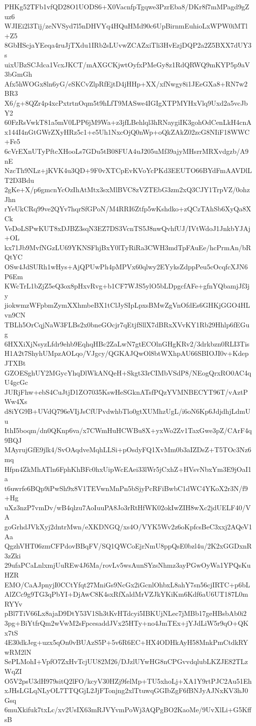 PHKg52TFb1vfQD28O1UODS6+X0VacnfpTgqwe3PzrEba8/DKr8f7mMPagd9gZuz6
WJIEi2l3Tij/zeNVSyd7l5nDHVYq4HQuHMd90c6UpBirnmEuhioLxWPW0iMTl+Z5
8GbHScjaYEeqa4ruJjTXdu1IRb2sLUvwZCAZxiTli3HvEzjDQP2a2Z5BXX7dUY3s
uixUBzSCJdca1VcxJKCT/mAXGCKjwtOyfxPMeGy8z1RdQRWQ9mKYP5p9aV3bGmGh
Afx5hWOGx8ln6yG/eSKCvZlpRfEjtD4jHHp+XX/xfNwgy8i1JEeGXa8+RN7w2BR3
X6/g+8QZr4p4xcPxtrtnOqm5t9hLfT9MASwe4IGIgXTPMYHxVlq9Uxd2a5vcJbY2
60FzRsVwkT81a5mV0LPP6jM9Wa+z3jfLBehlql3hRNaygiIK3gohOdCenLkH4cnA
x144I4nGtGWrZXyHRz5c1+e5Uh1NxcOjQ0nWp+oQkZAkZ02zcG8NIiF18WWC+Fe5
6cVrEXnUTyPftcXHooLs7GDu5tB08FUA4uJ205uMf39ajyMHsrrMRXvdgzb/A9nE
NzcTh9NLz+jKVK4u3QD+9F0vXTCpEvKVoYcPKd3EEUTO66BYdFmAAVDlLT2D3Bdu
2gKe+X/p6gmcnYcOzIhAtMtx3sxMlBVC8zVZTEbG3zm2xQ3CJY1TrpVZ/0ohzJhn
rYeUkCRq99ve2QYv7hqrSfGPoN/M4RRI6Ztfp5wKshdko+zQCzTAhSb6XyQa8XCk
VeDoLSPwKUT8xDJBZ3sqN3EZ7DS3VcnTS5J8nwQvhfUJ/IVtWdoJ1JnkbYJAj+OL
kx71Jb9MvfNGzLU69YKNSFhjBxY0lTyRiRa3CWH3mdTpFAuEe/hcPrmAn/bRQtYC
OSw4JdSURh1wHys+AjQPUwPh4pMPVx60qlwy2EYyksZdppPeu5cOcqfcXJN6P6Em
KWcTrL1bZjZ5eQ3ox8pHxvRvg+b1CF7WJS5ylO5bLDpgcfAFe+gfnYQbamjJf3jy
jiokwmzWFpbmZymXXhmbeBX1tClJySIpLpxsBMwZgVnOfdEs6GHKjGGO4HLvn9CN
TBLh5OrCqjNaW3FLBs2x0bneGOcjr7qEtjfSllX7dBRxXVvKY1Rb29Hhlp6fEGug
6HXXiXjNsyzLfdr9ehb9EqhqHBc2ZaLwN7gtECOlnGHgKRv2/3drkbzn0RLI3Tis
H1A2t7ShyhUMpzAOLqo/VJgcy/QGKAJQwOl8btWXhpAU66SBIOJI0v+KdepJTXBt
GZOESghUY2MGycYhqDlWkANQeH+Skgt33rCIMbVSdP8/NEogQrxRO0AC4qU4gcGc
JURjFhw+ebS4CuJtjD1ZO7035KswHeSGknATsfPQzYVMNBECYT96T/vAztPWw4Xs
d8iYG9B+UVdQ796eVIjJsCfUPvdwhbTlo0gtXUMhzUgL/i6oN6Kp6JdjdhjLdmUu
IthI5boqm/dn0QKnp6va/x7CWmHuHCWBu8X+yxWo2Zv1TaxGwe3pZ/CArF4q9BQJ
MAyrujGfE9jlk4/SvOAqdveMqhLLSi+pOsdyFQ1XvMm0b3aIZDsZ+T5TOc3Nz6mq
Hfpn4ZkMhATln6FphKhBFc0hxUipWcEAei33lWr5jCxhZ+HVsvNbxYm3E9jOaI1a
t6uwrfe6BQp9iPwSh9x8V1TEVwnMnPn5bSjyPcRFiBwbC1dWC4YKoX2r3N/f9+Hg
uXz3nzP7vmDv/wB4qlzu7AoIuuPA8Jo3rRtHfWK02okIwZIH8wXc2jdUELF40/VA
goGrhdJVkXyj2dntrMwn/eXKDNGQ/xs4O/VYK5Wv2z6oKpfcsBeC3xxj2AQeV1Aa
QgzhVHT06zmCFPdovBBqFV/SQ1QWCoEjrNmU8ppQsE0bzl4u/2K2xGGDxnR3zZki
29ufaPCaLnlxmjUuREw4J6Ma/rovLv5wsAunSYzsNhmz3ayPGwOyWa1YPQsKuHZR
EMO/CaAJpnyjI0CCtYfqt27MniGs9NcGx2iGcnlOhbxL8ahY7sn56cjIRTC+p6bL
AlZCc9g9TG3qPbYI+DjAwC8K4sxRfXaldMrVZJkYKiKm6Kdf6aU6UT187L0mRYYv
pBl7TiV66Lx8ajaD9DtY53V1Sh3tKvHTdcyi5IBKUjNLec7jMBb17geHBsbAb0i2
3pg+BiYtfrQm2wVwM2sFpcesaddJVx25HTy+no4JmTEx+jYJdLiW5r9qO+QKx7tS
4E30dkJeg+uzx5qOn0vBUAzS5P+5v6R6EC+HX4ODHkAyH58MnkPmCtdkRYwRM2lN
SePLMohI+VpfO7ZxHvTcjUU82M26/DJzlUYwHG8nCPGvvdqlubLKZJE82TLzWqZI
O5V2psU3dH979sitQ2lFO/kcyV30HZj9felMp+TU5xhoLj+XA1Y9rtPJC2Au51Eh
xJHsLGLqNLyOL7TTQGjL2JjFTonjng2xlTtuwqGGIbZgF6fBNJyAJNxKV3hJ0Gsq
6muXkifuk7txLc/xv2UsIX63mRJVYvmPoWj3AQPgBO2KaoMe/9UvXlLi+G5KffsB

